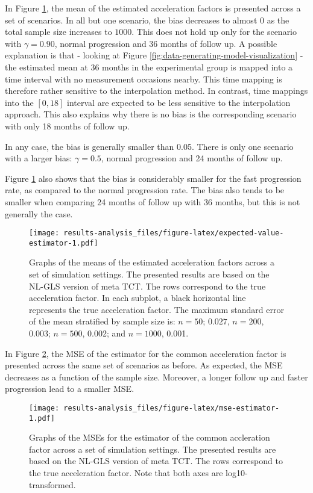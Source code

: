 \documentclass[
]{article}
\begin{document}
In Figure \ref{fig:expected-value-estimator}, the mean of the estimated
acceleration factors is presented across a set of scenarios. In all but one
scenario, the bias decreases to almost 0 as the total sample size increases to
\(1000\). This does not hold up only for the scenario with \(\gamma = 0.90\), normal
progression and 36 months of follow up. A possible explanation is that - looking
at Figure \ref{fig:data-generating-model-visualization} - the estimated mean at
36 months in the experimental group is mapped into a time interval with no
measurement occasions nearby. This time mapping is therefore rather sensitive
to the interpolation method. In contrast, time mappings into the \([0, 18]\)
interval are expected to be less sensitive to the interpolation approach. This
also explains why there is no bias is the corresponding scenario with only 18 months
of follow up.

In any case, the bias is generally
smaller than 0.05. There is only one scenario with a larger bias: \(\gamma = 0.5\), normal progression and 24 months of follow up.

Figure \ref{fig:expected-value-estimator} also shows that the bias is
considerably smaller for the fast progression rate, as compared to the normal
progression rate. The bias also tends to be smaller when comparing 24 months of
follow up with 36 months, but this is not generally the case.

\begin{figure}
\centering
\texttt{[image: results-analysis\_files/figure-latex/expected-value-estimator-1.pdf]}
\caption{\label{fig:expected-value-estimator}Graphs of the means of the estimated acceleration factors across a set of simulation settings. The presented results are based on the NL-GLS version of meta TCT. The rows correspond to the true acceleration factor. In each subplot, a black horizontal line represents the true acceleration factor. The maximum standard error of the mean stratified by sample size is: \(n = 50\); \(0.027\), \(n = 200\), 0.003; \(n = 500\), 0.002; and \(n = 1000\), 0.001.}
\end{figure}

In Figure \ref{fig:mse-estimator}, the MSE of the estimator for the common
acceleration factor is presented across the same set of scenarios as before. As
expected, the MSE decreases as a function of the sample size. Moreover, a longer
follow up and faster progression lead to a smaller MSE.

\begin{figure}
\centering
\texttt{[image: results-analysis\_files/figure-latex/mse-estimator-1.pdf]}
\caption{\label{fig:mse-estimator}Graphs of the MSEs for the estimator of the common accleration factor across a set of simulation settings. The presented results are based on the NL-GLS version of meta TCT. The rows correspond to the true acceleration factor. Note that both axes are log10-transformed.}
\end{figure}
\end{document}
